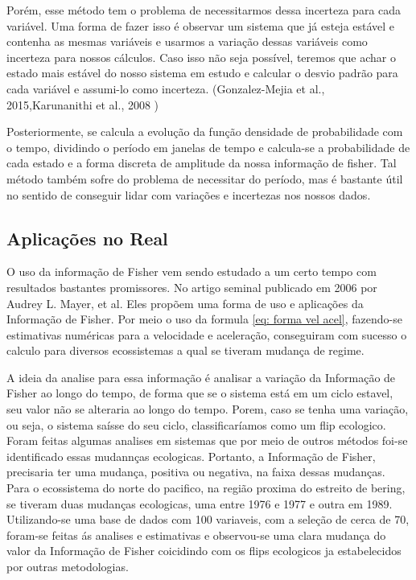\documentclass{article}[12pt]
\begin{document}
Porém, esse método tem o problema de necessitarmos dessa incerteza para cada variável. Uma forma de
fazer isso é observar um sistema que já esteja estável e contenha as mesmas variáveis e usarmos a
variação dessas variáveis como incerteza para nossos cálculos. Caso isso não seja possível, teremos
que achar o estado mais estável do nosso sistema em estudo e calcular o desvio padrão para cada
variável e assumi-lo como incerteza. (Gonzalez-Mejia et al., 2015,Karunanithi
et al., 2008 ) \par

Posteriormente, se calcula a evolução da função densidade de probabilidade com o tempo, dividindo o
período em janelas de tempo e calcula-se a probabilidade de cada estado e a forma discreta de
amplitude da nossa informação de fisher. Tal método também sofre do problema de necessitar do
período, mas é bastante útil no sentido de conseguir lidar com variações e incertezas nos nossos
dados.

\par


\subsection{Aplicações no Real}

O uso da informação de Fisher vem sendo estudado a um certo tempo com resultados bastantes promissores. No artigo seminal publicado em 2006 por Audrey L. Mayer, et al. Eles propõem uma forma de uso e aplicações da Informação de Fisher.
Por meio o uso da formula \eqref{eq: forma vel acel}, fazendo-se estimativas numéricas para a velocidade e aceleração, conseguiram com sucesso o calculo para diversos ecossistemas a qual se tiveram mudança de regime. \par

A ideia da analise para essa informação é analisar a variação da Informação de Fisher ao longo do tempo, de forma que se o sistema está em um ciclo estavel, seu valor não se alteraria ao longo do tempo. Porem, caso se tenha uma variação, ou seja, o sistema saísse do seu ciclo, classificaríamos como um flip ecologico.
Foram feitas algumas analises em sistemas que por meio de outros métodos foi-se identificado essas mudannças ecologicas. Portanto, a Informação de Fisher, precisaria ter uma mudança, positiva ou negativa, na faixa dessas mudanças. Para o ecossistema do norte do pacifico, na região proxima do estreito de bering, se tiveram duas mudanças ecologicas, uma entre 1976 e 1977 e outra em 1989.
Utilizando-se uma base de dados com 100 variaveis, com a seleção de cerca de 70, foram-se feitas ás analises e estimativas e observou-se uma clara mudança do valor da Informação de Fisher coicidindo com os flips ecologicos ja estabelecidos por outras metodologias.\par
\end{document}
